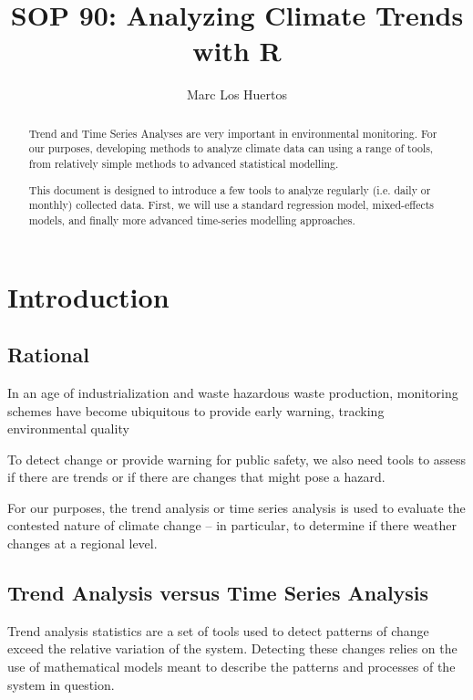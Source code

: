 \documentclass{article}\usepackage[]{graphicx}\usepackage[]{color}
\title{SOP 90: Analyzing Climate Trends with R}
\author{Marc Los Huertos}
\begin{document}
\maketitle
\tableofcontents

\begin{abstract}
\noindent Trend and Time Series Analyses are very important in environmental monitoring. For our purposes, developing methods to analyze climate data can using a range of tools, from relatively simple methods to advanced statistical modelling. 

This document is designed to introduce a few tools to analyze regularly (i.e. daily or monthly) collected data. First, we will use a standard regression model, mixed-effects models, and finally more advanced time-series modelling approaches.   

\end{abstract}


\section{Introduction}

\subsection{Rational}

In an age of industrialization and waste hazardous waste production, monitoring schemes have become ubiquitous to provide early warning, tracking environmental quality 

To detect change or provide warning for public safety, we also need tools to assess if there are trends or if there are changes that might pose a hazard.

For our purposes, the trend analysis or time series analysis is used to evaluate the contested nature of climate change -- in particular, to determine if there weather changes at a regional level. 

\subsection{Trend Analysis versus Time Series Analysis}

Trend analysis statistics are a set of tools used to detect patterns of change exceed the relative variation of the system. Detecting these changes relies on the use of mathematical models meant to describe the patterns and processes of the system in question. 
\end{document}
